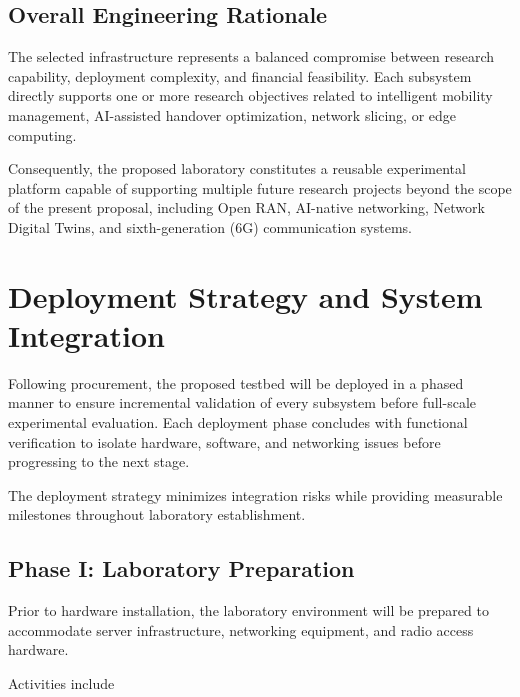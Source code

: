 \documentclass[12pt,a4paper]{article}\usepackage[a4paper,margin=1in]{geometry}\usepackage{graphicx}\usepackage{longtable}\usepackage{booktabs}\usepackage{hyperref}\usepackage{enumitem}\usepackage{amsmath}\usepackage{tikz}\usepackage{pgfgantt}\usepackage{setspace}\setstretch{1.15}\usetikzlibrary{positioning,arrows.meta,shapes.geometric}
\begin{document}
	
	\subsection{Overall Engineering Rationale}
	
	The selected infrastructure represents a balanced compromise between research capability, deployment complexity, and financial feasibility. Each subsystem directly supports one or more research objectives related to intelligent mobility management, AI-assisted handover optimization, network slicing, or edge computing.
	
	Consequently, the proposed laboratory constitutes a reusable experimental platform capable of supporting multiple future research projects beyond the scope of the present proposal, including Open RAN, AI-native networking, Network Digital Twins, and sixth-generation (6G) communication systems.
	
	\section{Deployment Strategy and System Integration}
	
	Following procurement, the proposed testbed will be deployed in a phased manner to ensure incremental validation of every subsystem before full-scale experimental evaluation. Each deployment phase concludes with functional verification to isolate hardware, software, and networking issues before progressing to the next stage.
	
	The deployment strategy minimizes integration risks while providing measurable milestones throughout laboratory establishment.
	
	
	\subsection{Phase I: Laboratory Preparation}
	
	Prior to hardware installation, the laboratory environment will be prepared to accommodate server infrastructure, networking equipment, and radio access hardware.
	
	Activities include
	
\end{document}
